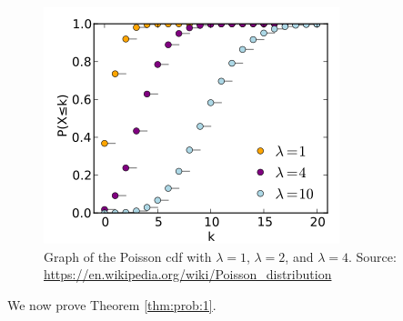 \begin{figure}[h]
\caption{\label{fig:1} Graph of the Poisson cdf with $\lambda=1$, $\lambda=2$, and $\lambda=4$. Source: \url{https://en.wikipedia.org/wiki/Poisson_distribution}}
\centering
\includegraphics[width=0.4\linewidth]{Poisson_cdf.png}
\end{figure}



We now prove Theorem \ref{thm:prob:1}.

